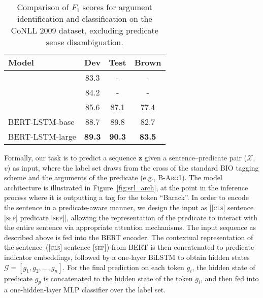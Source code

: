 \documentclass[11pt,a4paper]{article}
\begin{document}
\begin{table}[t]
	\centering
	\small
	\begin{tabular}{l ccc}
		\toprule
		\textbf{Model}      &  \textbf{Dev} & \textbf{Test} & \textbf{Brown} \\ \midrule
		\citet{marcheggiani2017encoding} &  83.3 & - & - \\ 
		\citet{he2018syntax} & 84.2 & - & - \\
		\citet{shi2017joint} & 85.6 & 87.1  & 77.4  \\
		\midrule 
		BERT-LSTM-base & 88.7 & 89.8 & 82.7\\
		BERT-LSTM-large & \textbf{89.3} & \textbf{90.3} & \textbf{83.5} \\
		\bottomrule
	\end{tabular}
	\caption{Comparison of $F_1$ scores for argument identification and classification on the CoNLL 2009 dataset, excluding predicate sense disambiguation.}
	\label{res:conll09_exclude}
\end{table}

Formally, our task is to predict a sequence $\boldsymbol{z}$ given a sentence--predicate pair ($\mathcal{X}$, $v$) as input, where the label set draws from the cross of the standard BIO tagging scheme and the arguments of the predicate (e.g., \textsc{B-Arg1}).
The model architecture is illustrated in Figure~\ref{fig:srl_arch}, at the point in the inference process where it is outputting a tag for the token ``Barack''.
In order to encode the sentence in a predicate-aware manner, we design the input as [[\textsc{cls}] sentence [\textsc{sep}] predicate [\textsc{sep}]], allowing the representation of the predicate to interact with the entire sentence via appropriate attention mechanisms.
The input sequence as described above is fed into the BERT encoder. 
The contextual representation of the sentence~([\textsc{cls}] sentence [\textsc{sep}]) from BERT is then concatenated to predicate indicator embeddings, followed by a one-layer BiLSTM to obtain hidden states $\mathcal{G} = [g_1, g_2, ..., g_n]$. 
For the final prediction on each token $g_{i}$, the hidden state of predicate $g_{p}$ is concatenated to the hidden state of the token $g_{i}$, and then fed into a one-hidden-layer MLP classifier over the label set.
\end{document}
